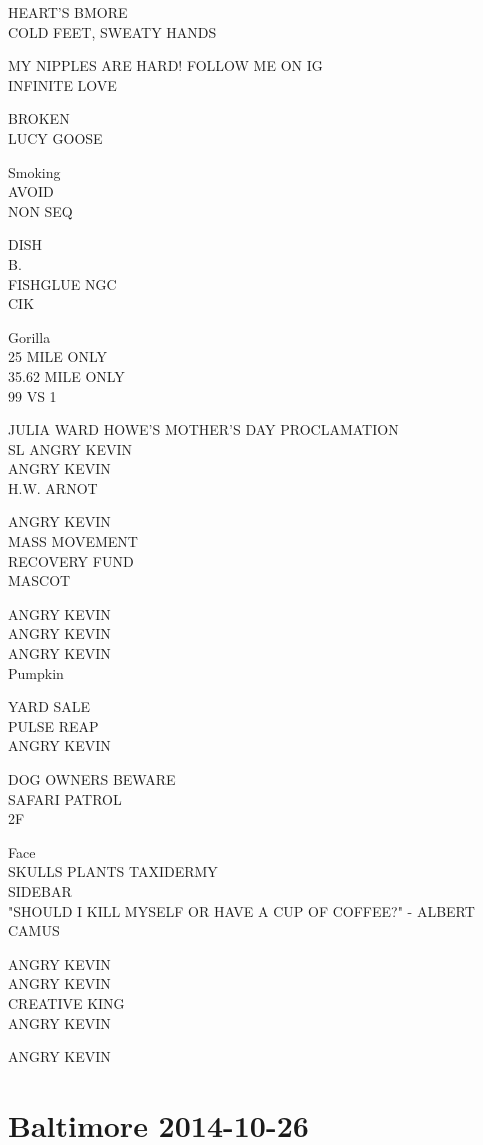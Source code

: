 \documentclass[10pt,letterpaper]{article}
\begin{document}
HEART'S BMORE\\
COLD FEET, SWEATY HANDS

MY NIPPLES ARE HARD!  FOLLOW ME ON IG\\
INFINITE LOVE

BROKEN\\
LUCY GOOSE

Smoking\\
AVOID\\
NON SEQ

DISH\\
B.\\
FISHGLUE NGC\\
CIK

Gorilla\\
25 MILE ONLY\\
35.62 MILE ONLY\\
99 VS 1

JULIA WARD HOWE'S MOTHER'S DAY PROCLAMATION\\
SL ANGRY KEVIN\\
ANGRY KEVIN\\
H.W. ARNOT

ANGRY KEVIN\\
MASS MOVEMENT\\
RECOVERY FUND\\
MASCOT

ANGRY KEVIN\\
ANGRY KEVIN\\
ANGRY KEVIN\\
Pumpkin

YARD SALE\\
PULSE REAP\\
ANGRY KEVIN

DOG OWNERS BEWARE\\
SAFARI PATROL\\
2F

Face\\
SKULLS PLANTS TAXIDERMY\\
SIDEBAR\\
"SHOULD I KILL MYSELF OR HAVE A CUP OF COFFEE?" {-} ALBERT CAMUS

ANGRY KEVIN\\
ANGRY KEVIN\\
CREATIVE KING\\
ANGRY KEVIN

ANGRY KEVIN


\section*{Baltimore 2014-10-26}
\end{document}
